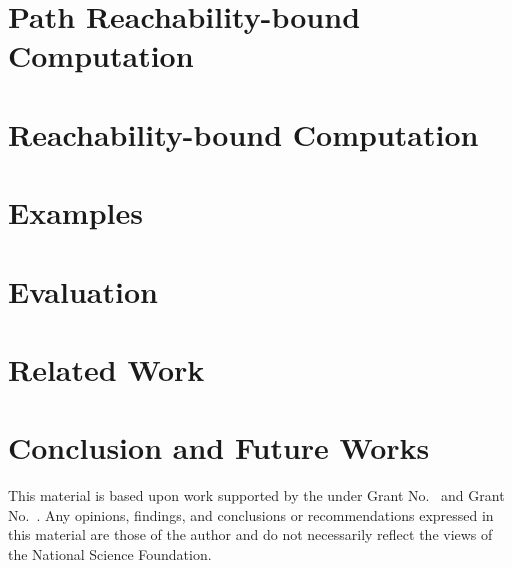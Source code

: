 \documentclass[manuscript,acmsmall,anonymous,review,screen,nonacm=true, authorversion=true]{acmart}
\begin{document}
\section{Path Reachability-bound Computation}
\label{sec:pathrb}


\section{Reachability-bound Computation}
\label{sec:alg-rb}


% 
\section{Examples}
\label{sec:example}

\section{Evaluation}
\label{sec:eval}

\section{Related Work}
\label{sec:relatedwork}

%
\section{Conclusion and Future Works}
\label{sec:conlusion}

\clearpage




\begin{acks}
This material is based upon work supported by the
 under Grant
No.~ and Grant
No.~.  Any opinions, findings, and
conclusions or recommendations expressed in this material are those
of the author and do not necessarily reflect the views of the
National Science Foundation.
\end{acks}
\end{document}

